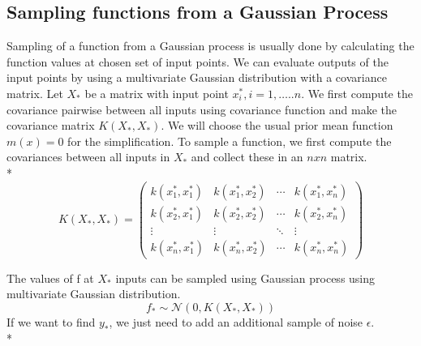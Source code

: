 \documentclass{article}
\begin{document}
\subsection{Sampling functions from a Gaussian Process}
Sampling of a function from a Gaussian process is usually done by calculating the function values at chosen set of input points. We can evaluate outputs of the input points by using a multivariate Gaussian distribution with a covariance matrix. Let $X_*$ be a matrix with input point ${x_i^*}, i=1,…..n$. We first compute the covariance pairwise between all inputs using covariance function and make the covariance matrix $K(X_*,X_*)$. We will choose the usual prior mean function $m(x)=0$ for the simplification. To sample a function, we first compute the covariances between all inputs in $X_*$ and collect these in an $n x n$ matrix. 
\\*
$$K(X_*,X_*) = 
\begin{pmatrix}
k(x_1^*,x_1^*) & k(x_1^*,x_2^*) & \cdots & k(x_1^*,x_n^*) \\
k(x_2^*,x_1^*) & k(x_2^*,x_2^*) & \cdots & k(x_2^*,x_n^*) \\
\vdots  & \vdots  & \ddots & \vdots  \\
k(x_n^*,x_1^*) & k(x_n^*,x_2^*) & \cdots & k(x_n^*,x_n^*)
\end{pmatrix}$$

The values of f at $X_*$ inputs can be sampled using Gaussian process using multivariate Gaussian distribution.
$$f_{*} \sim \mathcal{N}{\left(0, K(X_*,X_*)\right)}$$
If we want to find $y_*$, we just need to add an additional sample of noise $\epsilon$. 
\\*
\end{document}
